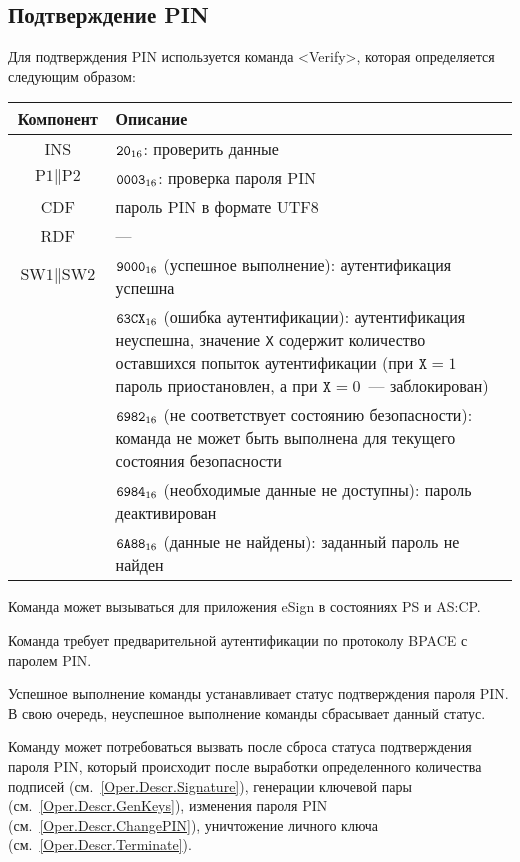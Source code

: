 \subsection{Подтверждение PIN}
\label{Oper.Descr.VerifyPIN}

Для подтверждения PIN используется команда
<Verify>, которая определяется следующим образом:

\noindent
\begin{tabular}{|c|p{14cm}|}
\hline
Компонент & Описание \\
\hline
\hline
INS & $\texttt{20}_{16}$: проверить данные\\
\hline
$\text{P1} \parallel \text{P2}$ & $\texttt{0003}_{16}$: 
проверка пароля PIN\\
\hline
CDF & пароль PIN в формате UTF8
\\
\hline \hline
RDF &  --- \\
\hline
$\text{SW1} \parallel \text{SW2}$ & $\texttt{9000}_{16}$ 
(успешное выполнение): аутентификация успешна\\
 & $\texttt{63CX}_{16}$ (ошибка аутентификации): аутентификация неуспешна, 
значение \texttt{X} содержит количество оставшихся попыток аутентификации 
(при $\texttt{X} = 1$ пароль приостановлен, а при $\texttt{X} = 0$~--- 
заблокирован)\\ 
 & $\texttt{6982}_{16}$ (не соответствует состоянию безопасности): команда не может 
быть выполнена для текущего состояния безопасности\\
 & $\texttt{6984}_{16}$ (необходимые данные не доступны): пароль деактивирован \\
 & $\texttt{6A88}_{16}$ (данные не найдены): заданный пароль не найден\\
\hline
\end{tabular}

Команда может вызываться для приложения eSign
в состояниях PS и AS:CP.

Команда требует предварительной аутентификации по 
протоколу BPACE с паролем PIN.

Успешное выполнение команды устанавливает 
статус подтверждения пароля PIN.
В свою очередь, неуспешное выполнение команды 
сбрасывает данный статус.

Команду может потребоваться вызвать после сброса статуса
подтверждения пароля PIN, который происходит 
после выработки определенного количества подписей (см.~\ref{Oper.Descr.Signature}),
генерации ключевой пары (см.~\ref{Oper.Descr.GenKeys}),
изменения пароля PIN (см.~\ref{Oper.Descr.ChangePIN}),
уничтожение личного ключа (см.~\ref{Oper.Descr.Terminate}).

